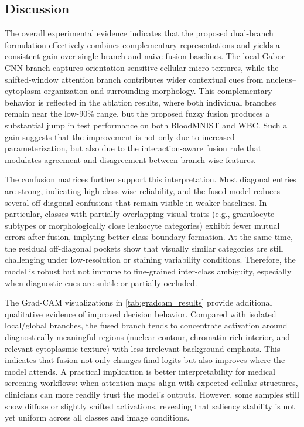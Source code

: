 \documentclass[preprint,12pt]{elsarticle}
\begin{document}
\FloatBarrier
\subsection{Discussion}
The overall experimental evidence indicates that the proposed dual-branch formulation effectively combines complementary representations and yields a consistent gain over single-branch and naive fusion baselines. The local Gabor-CNN branch captures orientation-sensitive cellular micro-textures, while the shifted-window attention branch contributes wider contextual cues from nucleus--cytoplasm organization and surrounding morphology. This complementary behavior is reflected in the ablation results, where both individual branches remain near the low-90\% range, but the proposed fuzzy fusion produces a substantial jump in test performance on both BloodMNIST and WBC. Such a gain suggests that the improvement is not only due to increased parameterization, but also due to the interaction-aware fusion rule that modulates agreement and disagreement between branch-wise features.

The confusion matrices further support this interpretation. Most diagonal entries are strong, indicating high class-wise reliability, and the fused model reduces several off-diagonal confusions that remain visible in weaker baselines. In particular, classes with partially overlapping visual traits (e.g., granulocyte subtypes or morphologically close leukocyte categories) exhibit fewer mutual errors after fusion, implying better class boundary formation. At the same time, the residual off-diagonal pockets show that visually similar categories are still challenging under low-resolution or staining variability conditions. Therefore, the model is robust but not immune to fine-grained inter-class ambiguity, especially when diagnostic cues are subtle or partially occluded.

The Grad-CAM visualizations in \autoref{tab:gradcam_results} provide additional qualitative evidence of improved decision behavior. Compared with isolated local/global branches, the fused branch tends to concentrate activation around diagnostically meaningful regions (nuclear contour, chromatin-rich interior, and relevant cytoplasmic texture) with less irrelevant background emphasis. This indicates that fusion not only changes final logits but also improves where the model attends. A practical implication is better interpretability for medical screening workflows: when attention maps align with expected cellular structures, clinicians can more readily trust the model’s outputs. However, some samples still show diffuse or slightly shifted activations, revealing that saliency stability is not yet uniform across all classes and image conditions.
\end{document}
